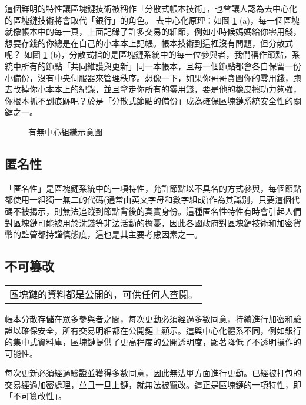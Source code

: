 \documentclass[12pt, a4paper]{article}
\begin{document}
這個鮮明的特性讓區塊鏈技術被稱作「分散式帳本技術」，也曾讓人認為去中心化的區塊鏈技術將會取代「銀行」的角色。
去中心化原理：如圖 \ref{fig:central} (a)，每一個區塊就像帳本中的每一頁，上面記錄了許多交易的細節，例如小時候媽媽給你零用錢，想要存錢的你總是在自己的小本本上記帳。帳本技術到這裡沒有問題，但分散式呢？
如圖 \ref{fig:central} (b)，分散式指的是區塊鏈系統中的每一位參與者，我們稱作節點，系統中所有的節點「共同維護與更新」同一本帳本，且每一個節點都會各自保留一份小備份，沒有中央伺服器來管理秩序。想像一下，如果你哥哥貪圖你的零用錢，跑去改掉你小本本上的紀錄，並且拿走你所有的零用錢，要是他的橡皮擦功力夠強，你根本抓不到痕跡吧？於是「分散式節點的備份」成為確保區塊鏈系統安全性的關鍵之一。
\begin{figure}[H]
    \centering
    \caption{有無中心組織示意圖}
    \label{fig:central}
\end{figure}
\subsection{\SM 匿名性}
「匿名性」是區塊鏈系統中的一項特性，允許節點以不具名的方式參與，每個節點都使用一組獨一無二的代碼(通常由英文字母和數字組成)作為其識別，只要這個代碼不被揭示，則無法追蹤到節點背後的真實身份。這種匿名性特性有時會引起人們對區塊鏈可能被用於洗錢等非法活動的擔憂，因此各國政府對區塊鏈技術和加密貨幣的監管都持謹慎態度，這也是其主要考慮因素之一。
\subsection{\PP 不可篡改}
\bigskip     %
\begin{center}\colorbox{bubbles}{\begin{tabular}{p{}}
	 {區塊鏈的資料都是公開的，可供任何人查閱。	}
\end{tabular}}
\end{center}
\bigskip	
帳本分散存儲在眾多參與者之間，每次更動必須經過多數同意，持續進行加密和驗證以確保安全，所有交易明細都在公開鏈上顯示。這與中心化體系不同，例如銀行的集中式資料庫，區塊鏈提供了更高程度的公開透明度，顯著降低了不透明操作的可能性。

每次更新必須經過驗證並獲得多數同意，因此無法單方面進行更動。已經被打包的交易經過加密處理，並且一旦上鏈，就無法被竄改。這正是區塊鏈的一項特性，即「不可篡改性」。
\end{document}
